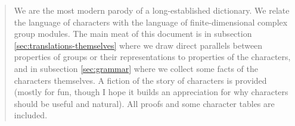 \begin{abstract}
  \pan We are the most modern parody of a long-established dictionary.  We relate the language of characters with the language of finite-dimensional complex group modules. The main meat of this document is in subsection \ref{sec:translations-themselves} where we draw direct parallels between properties of groups or their representations to properties of the characters, and in subsection \ref{sec:grammar} where we collect some facts of the characters themselves. A fiction of the story of characters is provided (mostly for fun, though I hope it builds an appreciation for why characters should be useful and natural). All proofs and some character tables are included.
\end{abstract}

\tableofcontents

\newpage

\newpage

\newpage

\newpage

